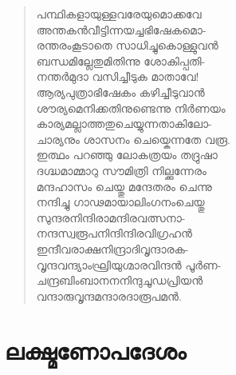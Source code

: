 \begin{verse}
പന്ഥികളായുള്ളവരേയുമൊക്കവേ\\
അന്തകന്‍വീട്ടിന്നയച്ചഭിഷേകമൊ-\\
രന്തരംകൂടാതെ സാധിച്ചുകൊള്ളുവന്‍\\
ബന്ധമില്ലേതുമിതിന്നു ശോകിപ്പതി-\\
നന്തര്‍മുദാ വസിച്ചീടുക മാതാവേ!\\
ആര്യപുത്രാഭിഷേകം കഴിച്ചീടുവാന്‍\\
ശൗര്യമെനിക്കതിനുണ്ടെന്നു നിര്‍ണയം\\
കാര്യമല്ലാത്തതുചെയ്യുന്നതാകിലോ-\\
ചാര്യനും ശാസനം ചെയ്കെന്നതേ വരൂ.\\
ഇത്ഥം പറഞ്ഞു ലോകത്രയം തദ്രുഷാ\\
ദഗ്ദ്ധമാമ്മാറു സൗമിത്രി നില്ക്കുന്നേരം\\
മന്ദഹാസം ചെയ്തു മന്ദേതരം ചെന്നു\\
നന്ദിച്ചു ഗാഢമായാലിംഗനംചെയ്തു\\
സുന്ദരനിന്ദിരാമന്ദിരവത്സനാ-\\
നന്ദസ്വരൂപനിന്ദിന്ദിരവിഗ്രഹന്‍\\
ഇന്ദീവരാക്ഷനിന്ദ്രാദിവൃന്ദാരക-\\
വൃന്ദവന്ദ്യാംഘ്രിയുഗ്മാരവിന്ദന്‍ പൂര്‍ണ-\\
ചന്ദ്രബിംബാനനനിന്ദുചൂഡപ്രിയന്‍\\
വന്ദാരുവൃന്ദമന്ദാരദാരൂപമന്‍.
\end{verse}


\section{ലക്ഷ്മണോപദേശം}

